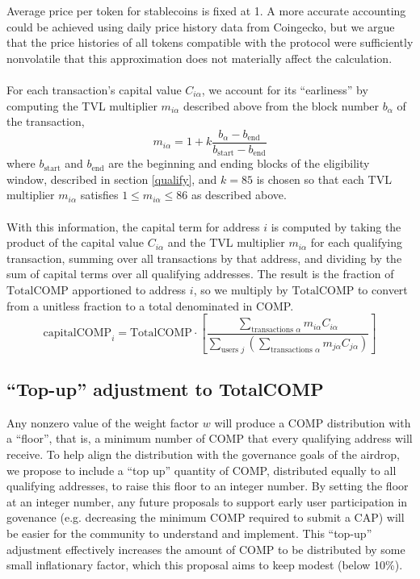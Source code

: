 \documentclass[12pt]{article}
\begin{document}
Average price per token for stablecoins is fixed at 1. 
A more accurate accounting could be achieved using daily price history data from Coingecko,
but we argue that the price histories of all tokens compatible with the protocol were
sufficiently nonvolatile that this approximation does not materially affect the calculation.
\\\\
For each transaction's capital value $C_{i\alpha}$, we account for its ``earliness'' by
computing the TVL multiplier $m_{i\alpha}$ described above from the block number $b_{\alpha}$ of the transaction,
\begin{equation*}
  m_{i\alpha} = 1 + k\frac{b_{\alpha} - b_{\textrm{end}}}
                     {b_{\textrm{start}}-b_{\textrm{end}}}
\end{equation*}
where $b_{\textrm{start}}$ and $b_{\textrm{end}}$ are the beginning and ending blocks of the
eligibility window, described in section \ref{qualify}, and $k=85$ is chosen so that each TVL
multiplier $m_{i\alpha}$ satisfies $1 \leq m_{i\alpha} \leq 86$ as described above.
\\\\
With this information, the capital term for address $i$ is computed by taking the product
of the capital value $C_{i\alpha}$ and the TVL multiplier $m_{i\alpha}$ for each qualifying
transaction, summing over all transactions by that address, and dividing by the sum of capital
terms over all qualifying addresses. The result is the fraction of $\textrm{TotalCOMP}$ 
apportioned to address $i$, so we multiply by $\textrm{TotalCOMP}$ to convert from a unitless
fraction to a total denominated in COMP.
\begin{equation*}
  \mathrm{capitalCOMP}_i = \textrm{TotalCOMP}\cdot\left[\frac{\sum\limits_{\textrm{transactions }\alpha}{m_{i\alpha}C_{i\alpha}}}{\sum\limits_{\textrm{users }j}\left({\sum\limits_{\textrm{transactions }\alpha}{m_{j\alpha}C_{j\alpha}}}\right)}\right]
\end{equation*}

\subsection{``Top-up'' adjustment to \textrm{TotalCOMP}}

Any nonzero value of the weight factor $w$ will produce a COMP distribution with a ``floor'',
that is, a minimum number of COMP that every qualifying address will receive.
To help align the distribution with the governance goals of the airdrop,
we propose to include a ``top up'' quantity of COMP, distributed equally to all qualifying
addresses, to raise this floor to an integer number. By setting the floor at an integer 
number, any future proposals to support early user participation in govenance
(e.g. decreasing the minimum COMP required to submit a CAP) will be easier for the
community to understand and implement. This ``top-up'' adjustment effectively
increases the amount of COMP to be distributed by some small inflationary factor,
which this proposal aims to keep modest (below 10\%).
\end{document}
